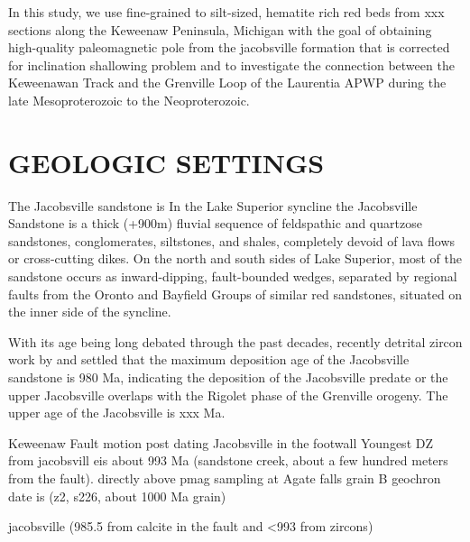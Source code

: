 \documentclass[11pt,letterpaper]{article}
\begin{document}
In this study, we use fine-grained to silt-sized, hematite rich red beds from xxx sections along the Keweenaw Peninsula, Michigan with the goal of obtaining high-quality paleomagnetic pole from the jacobsville formation that is corrected for inclination shallowing problem and to investigate the connection between the Keweenawan Track and the Grenville Loop of the Laurentia APWP during the late Mesoproterozoic to the Neoproterozoic. 

\section*{GEOLOGIC SETTINGS}


The Jacobsville sandstone is 
\cite{Kalliokoski1982a} In the Lake Superior syncline the Jacobsville Sandstone is a thick (+900m) fluvial sequence of feldspathic and quartzose sandstones, conglomerates, siltstones, and shales, completely devoid of lava flows or cross-cutting dikes. On the north and south sides of Lake Superior, most of the sandstone occurs as inward-dipping, fault-bounded wedges, separated by regional faults from the Oronto and Bayfield Groups of similar red sandstones, situated on the inner side of the syncline. 

With its age being long debated through the past decades, recently detrital zircon work by \cite{Malone2016a} and  settled that the maximum deposition age of the Jacobsville sandstone  is 980 Ma, indicating the deposition of the Jacobsville predate or the upper Jacobsville overlaps with the Rigolet phase of the Grenville orogeny. The upper age of the Jacobsville is xxx Ma.


Keweenaw Fault motion post dating Jacobsville in the footwall
Youngest DZ from jacobsvill eis about 993 Ma (sandstone creek, about a few hundred meters from the fault). 
directly above pmag sampling at Agate falls grain B geochron date is (z2, s226, about 1000 Ma grain)

jacobsville (985.5 from calcite in the fault and <993 from zircons) 
\end{document}
